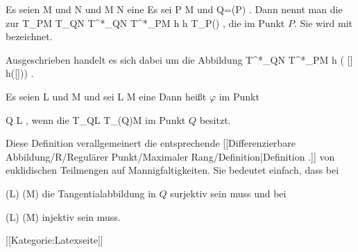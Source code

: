 {}
{

Es seien
\mathkor {} {M} {und} {N} {}
und
\maabbdisp {\varphi} { M } { N
} {}
eine
Es sei
\mathkor {} {P \in M} {und} {Q=\varphi(P)} {.}
Dann nennt man die zur
 { T_PM } { T_QN
} {}
\maabbeledisp {} { T^*_QN } { T^*_PM
} { h } { h \circ  T_P(\varphi)
} {,}
die  im Punkt $P$.  Sie wird mit
 bezeichnet.

}

Ausgeschrieben handelt es sich dabei um die Abbildung
\maabbeledisp {} {T^*_QN} {T^*_PM
} {h} {( [\gamma] \mapsto h([\varphi \circ \gamma]))
} {.}

{}
{

Es seien
\mathkor {} {L} {und} {M} {}
und sei
\maabbdisp {\varphi} { L } { M
} {}
eine
Dann heißt $\varphi$ im Punkt

\mavergleichskette
{\vergleichskette
{ Q
}
{ \in }{ L
}
{  }{
}
{    }{
}
{   }{
}
}
{}{}{}
 {} {,}
wenn die
 { T_QL } { T_{\varphi(Q)}M
} {}
im Punkt $Q$
besitzt.

}

Diese Definition verallgemeinert die entsprechende
[[Differenzierbare Abbildung/R/Regulärer Punkt/Maximaler Rang/Definition|Definition  .]]
von euklidischen Teilmengen auf Mannigfaltigkeiten. Sie bedeutet einfach, dass bei

\mavergleichskette
{\vergleichskette
{  (L)
}
{ \geq }{   (M)
}
{  }{
}
{    }{
}
{   }{
}
}
{}{}{}
die Tangentialabbildung in $Q$ surjektiv sein muss und bei

\mavergleichskette
{\vergleichskette
{  (L)
}
{ \leq }{   (M)
}
{  }{
}
{    }{
}
{   }{
}
}
{}{}{}
injektiv sein muss.

 [[Kategorie:Latexseite]]
